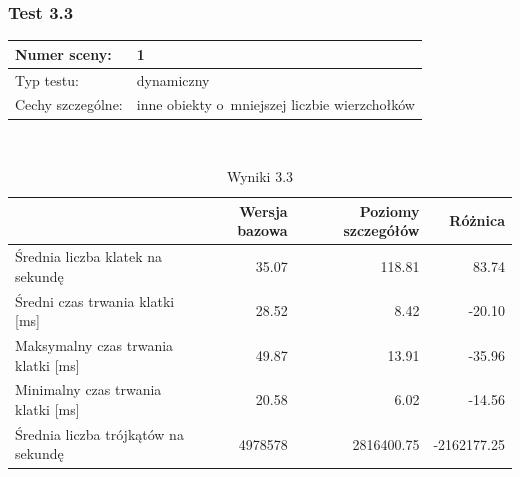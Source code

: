 \documentclass[a4paper,twoside,12pt]{book}
\begin{document}
\subsubsection{Test 3.3}
\begin{tabular}{|l||l|}
\hline
Numer sceny: & 1 \\
\hline
Typ testu: & dynamiczny \\
\hline
Cechy szczególne: & inne obiekty o~mniejszej liczbie wierzchołków \\
\hline
\end{tabular}\\

\begin{table}[H]
    \centering
    \caption{Wyniki 3.3}
    \label{tab:lod_test3}
    \begin{tabular}{|l||r|r|r|}
        \hline
        & Wersja bazowa & Poziomy szczegółów & Różnica \\
        \hline
        Średnia liczba klatek na sekundę & 35.07 & 118.81 & 83.74 \\
        \hline
        Średni czas trwania klatki [ms] & 28.52 & 8.42 & -20.10 \\
        \hline
        Maksymalny czas trwania klatki [ms] & 49.87 & 13.91 & -35.96 \\
        \hline
        Minimalny czas trwania klatki [ms] & 20.58 & 6.02 & -14.56 \\
        \hline
        Średnia liczba trójkątów na sekundę & 4978578 & 2816400.75 & -2162177.25 \\
        \hline
    \end{tabular}
\end{table}
\end{document}
